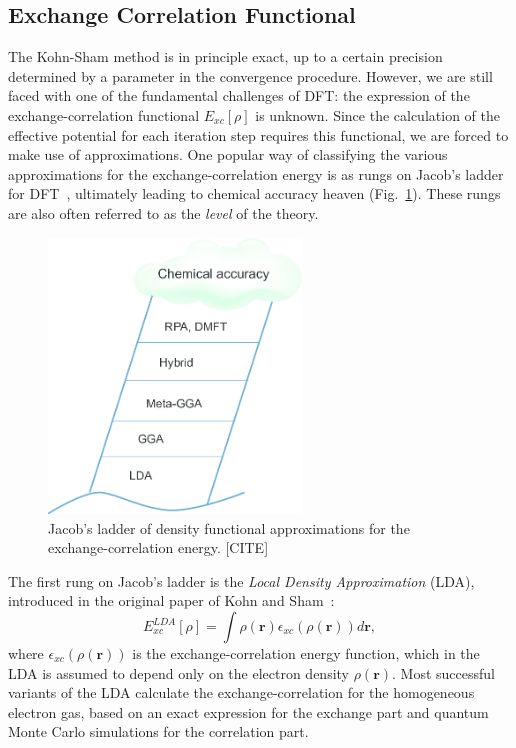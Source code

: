 \begin{refsection}
\subsection{Exchange Correlation Functional} \label{dft:sec-functionals} 
 
The Kohn-Sham method is in principle exact, up to a certain precision 
determined by a parameter in the convergence procedure. However, we are still 
faced with one of the fundamental challenges of DFT: the expression of the 
exchange-correlation functional $E_{xc}[\rho]$ is unknown. Since the calculation of the effective potential for each iteration step requires this functional, we 
are forced to make use of approximations. One popular way of classifying the 
various approximations for the exchange-correlation energy is as rungs on 
Jacob's ladder for DFT~\cite{Perdew2001}, ultimately leading to chemical 
accuracy heaven (Fig.~\ref{dft:fig-jacob}). These rungs are also often referred to 
as the \textit{level} of the theory. 
 
\begin{figure}[ht]
\centering 
\includegraphics[width=0.6\textwidth]{./figures/DFT/jacob.png} 
\caption{Jacob's ladder of density functional approximations for the 
exchange-correlation energy. [CITE]} 
\label{dft:fig-jacob} 
\end{figure} 
 
The first rung on Jacob's ladder is the \textit{Local Density Approximation} 
(LDA), introduced in the original paper of Kohn and Sham~\cite{Kohn1965}: 
\begin{equation} 
E_{xc}^{LDA}[\rho] = \int \rho(\mathbf{r}) 
\epsilon_{xc}(\rho(\mathbf{r}))d\mathbf{r}, 
\end{equation} 
where $\epsilon_{xc}(\rho(\mathbf{r}))$ is the exchange-correlation energy 
function, which in the LDA is assumed to depend only on the electron density 
$\rho(\mathbf{r})$. Most successful variants of the LDA calculate the 
exchange-correlation for the homogeneous electron gas, based on an exact 
expression for the exchange part and quantum Monte Carlo simulations for the 
correlation part. 
 

\end{refsection}
